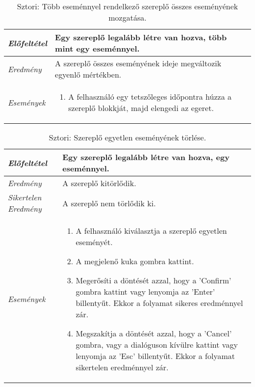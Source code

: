 \begin{table}[H]
	\centering
	\begin{tabular}{ | m{} | m{} | }
		\hline
		\emph{Előfeltétel} & Egy szereplő legalább létre van hozva, több mint egy eseménnyel.\\
		\hline
		\emph{Eredmény} & A szereplő összes eseményének ideje megváltozik egyenlő mértékben. \\
		\hline
		\hline
		\emph{Események} &
		\begin{enumerate}[itemsep=-1ex]
			\item A felhasználó egy tetszőleges időpontra húzza a szereplő blokkját, majd elengedi az egeret.
		\end{enumerate}
		\\
		\hline
	\end{tabular}
	\caption{Sztori: Több eseménnyel rendelkező szereplő összes eseményének mozgatása.}
	\label{tab:story-timeline-pan-actor-more-event-at-once}
\end{table}

\begin{table}[H]
	\centering
	\begin{tabular}{ | m{} | m{} | }
		\hline
		\emph{Előfeltétel} & Egy szereplő legalább létre van hozva, egy eseménnyel.\\
		\hline
		\emph{Eredmény} & A szereplő kitörlődik. \\
		\hline
		\emph{Sikertelen Eredmény} & A szereplő nem törlődik ki. \\
		\hline
		\hline
		\emph{Események} &
		\begin{enumerate}[itemsep=-1ex]
			\item A felhasználó kiválasztja a szereplő egyetlen eseményét.
			\item A megjelenő kuka gombra kattint.
			\item Megerősíti a döntését azzal, hogy a 'Confirm' gombra kattint vagy lenyomja az 'Enter' billentyűt. Ekkor a folyamat sikeres eredménnyel zár.
			\item  Megszakítja a döntését azzal, hogy a 'Cancel' gombra, vagy a dialóguson kívülre kattint vagy lenyomja az 'Esc' billentyűt. Ekkor a folyamat sikertelen eredménnyel zár.
		\end{enumerate}
		\\
		\hline
	\end{tabular}
	\caption{Sztori: Szereplő egyetlen eseményének törlése.}
	\label{tab:story-timeline-remove-actor-single-event}
\end{table}

